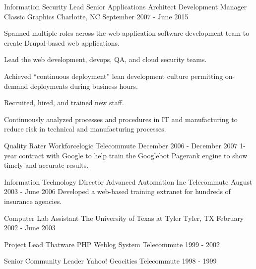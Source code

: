 \begin{cventries}

\cventry
{Information Security Lead \newline {\vspace{-.75mm}}
Senior Applications Architect \newline {\vspace{-.75mm}}
Development Manager}
{Classic Graphics} %
{Charlotte, NC} %
{September 2007 - June 2015} %
{
Spanned multiple roles across the web application software development team to create Drupal-based web applications.
\begin{cvitems}
\item[]
\item {Lead the web development, devops, QA, and cloud security teams.}
\item {Achieved “continuous deployment” lean development culture permitting on-demand deployments during business hours.}
\item {Recruited, hired, and trained new staff.}
\item {Continuously analyzed processes and procedures in IT and manufacturing to reduce risk in technical and manufacturing processes.}
\end{cvitems}
}


\cventry
{Quality Rater}
{Workforcelogic}
{Telecommute}
{December 2006 - December 2007} %
{ %
1-year contract with Google to help train the Googlebot Pagerank engine to show timely and accurate results.
}


\cventry
{Information Technology Director}
{Advanced Automation Inc}
{Telecommute}
{August 2003 - June 2006} %
{ %
Developed a web-based training extranet for hundreds of insurance agencies.
}


\cventry
{Computer Lab Assistant}
{The University of Texas at Tyler}
{Tyler, TX}
{February 2002 - June 2003} %
{ %
}


\cventry
{Project Lead}
{Thatware PHP Weblog System}
{Telecommute}
{1999 - 2002} %
{ %
}


\cventry
{Senior Community Leader}
{Yahoo! Geocities}
{Telecommute}
{1998 - 1999} %
{ %
}


\end{cventries}
